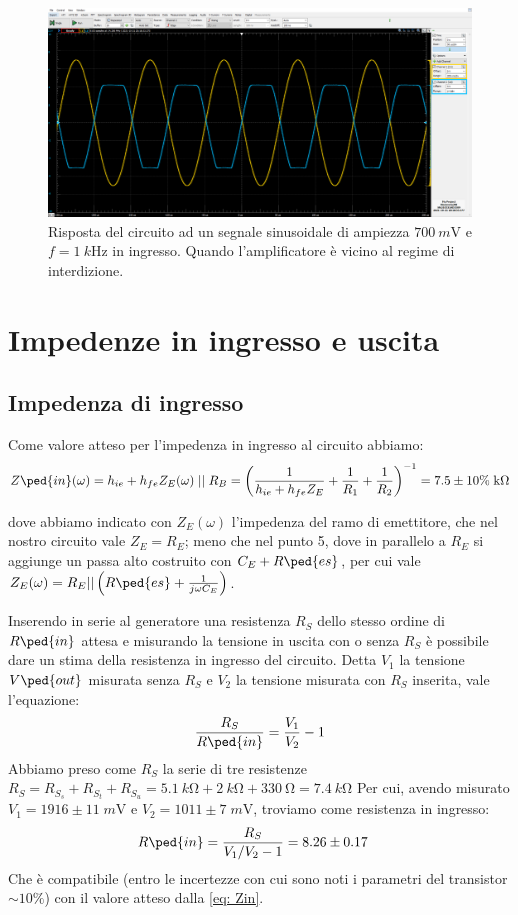 \documentclass[10pt,a4paper]{article}
\begin{document}
\begin{figure}[htb]
\centering
\includegraphics[scale=0.335]{Aint700mV}
\caption{Risposta del circuito ad un segnale sinusoidale di ampiezza
$\SI{700}{m\V}$ e $f = \SI{1}{k\Hz}$ in ingresso. Quando l'amplificatore
è vicino al regime di interdizione. \label{fig: Aint}}
\end{figure}

\section{Impedenze in ingresso e uscita}
\subsection{Impedenza di ingresso}
Come valore atteso per l'impedenza in ingresso al circuito abbiamo:
\[
Z\ped{in}(\omega) =
h_{ie} + h_{fe}Z_E(\omega) \; \lvert\rvert \; R_B =
\left(\frac{1}{h_{ie} + h_{fe}Z_E} + \frac{1}{R_1} + \frac{1}{R_2}\right)^{-1}
= 7.5 \pm 10\% \; \si{k\ohm} 
\]

dove abbiamo indicato con $Z_E(\omega)$ l'impedenza del ramo di emettitore,
che nel nostro circuito vale $Z_E = R_E$; meno che nel punto 5, dove in
parallelo a $R_E$ si aggiunge un passa alto costruito con $C_E + R\ped{es}$,
per cui vale $Z_E(\omega) = R_E || \left(R\ped{es} + \frac{1}{j \omega C_E}
\right)$.

Inserendo in serie al generatore una resistenza $R_S$ dello stesso ordine di
$R\ped{in}$ attesa e misurando la tensione in uscita con o senza $R_S$ è
possibile dare un stima della resistenza in ingresso del circuito.
Detta $V_1$ la tensione $V\ped{out}$ misurata senza $R_S$ e $V_2$ la tensione
misurata con $R_S$ inserita, vale l'equazione:
\begin{equation}\label{eq: Zin}
\frac{R_S}{R\ped{in}} = \frac{V_1}{V_2} - 1
\end{equation}
Abbiamo preso come $R_S$ la serie di tre resistenze $R_S =
R_{S_s} + R_{S_t} + R_{S_u} =
\SI{5.1}{k\ohm} + \SI{2}{k\ohm} + \SI{330}{\ohm} =
\SI{7.4}{k\ohm}$
Per cui, avendo misurato $V_1 = 1916 \pm 11 \; \si{m\V}$ e
$V_2 = 1011 \pm 7 \; \si{m\V}$, troviamo come resistenza in ingresso:
\begin{align*}
{R\ped{in}} &= \frac{R_S}{V_1/V_2 - 1} = 8.26 \pm 0.17
\end{align*}
Che è compatibile (entro le incertezze con cui sono noti i parametri del
transistor $\sim 10 \%$) con il valore atteso dalla \eqref{eq: Zin}.
\end{document}
